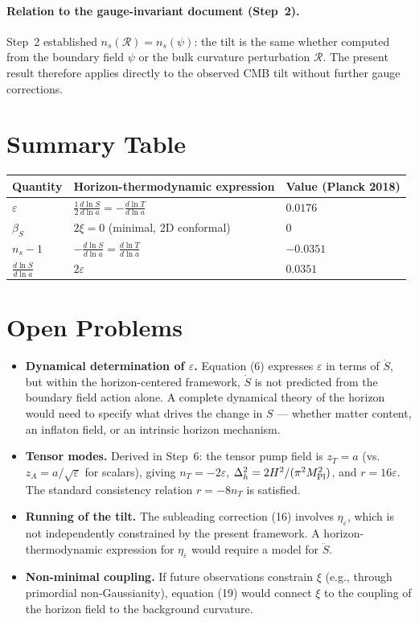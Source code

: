 \documentclass[12pt,a4paper]{article}
\begin{document}
\paragraph{Relation to the gauge-invariant document (Step~2).}
Step~2 established $n_s(\mathcal{R}) = n_s(\psi)$: the tilt is the same whether computed from the boundary field $\psi$ or the bulk curvature perturbation $\mathcal{R}$. The present result therefore applies directly to the observed CMB tilt without further gauge corrections.

\section{Summary Table}

\begin{table}[h]
\centering
\begin{tabular}{lll}
\toprule
Quantity & Horizon-thermodynamic expression & Value (Planck 2018) \\
\midrule
$\varepsilon$ & $\frac{1}{2}\frac{d\ln S}{d\ln a} = -\frac{d\ln T}{d\ln a}$ & $0.0176$ \\
$\beta_S$ & $2\xi = 0$ (minimal, 2D conformal) & $0$ \\
$n_s - 1$ & $-\frac{d\ln S}{d\ln a} = \frac{d\ln T}{d\ln a}$ & $-0.0351$ \\
$\frac{d\ln S}{d\ln a}$ & $2\varepsilon$ & $0.0351$ \\
\bottomrule
\end{tabular}
\end{table}

\section{Open Problems}

\begin{itemize}
  \item \textbf{Dynamical determination of $\varepsilon$.} Equation (6) expresses $\varepsilon$ in terms of $\dot{S}$, but within the horizon-centered framework, $\dot{S}$ is not predicted from the boundary field action alone. A complete dynamical theory of the horizon would need to specify what drives the change in $S$ --- whether matter content, an inflaton field, or an intrinsic horizon mechanism.
  \item \textbf{Tensor modes.} Derived in Step~6: the tensor pump field is $z_T = a$ (vs.\ $z_A = a/\sqrt\varepsilon$ for scalars), giving $n_T = -2\varepsilon$, $\Delta_h^2 = 2H^2/(\pi^2 M_{\rm Pl}^2)$, and $r = 16\varepsilon$. The standard consistency relation $r = -8n_T$ is satisfied.
  \item \textbf{Running of the tilt.} The subleading correction (16) involves $\eta_\varepsilon$, which is not independently constrained by the present framework. A horizon-thermodynamic expression for $\eta_\varepsilon$ would require a model for $\ddot{S}$.
  \item \textbf{Non-minimal coupling.} If future observations constrain $\xi$ (e.g., through primordial non-Gaussianity), equation (19) would connect $\xi$ to the coupling of the horizon field to the background curvature.
\end{itemize}
\end{document}
